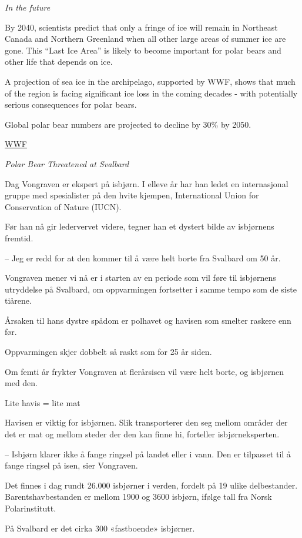 \documentclass[
]{book}
\begin{document}
\emph{In the future}

By 2040, scientists predict that only a fringe of ice will remain in Northeast Canada and Northern Greenland when all other large areas of summer ice are gone. This ``Last Ice Area'' is likely to become important for polar bears and other life that depends on ice.

A projection of sea ice in the archipelago, supported by WWF, shows that much of the region is facing significant ice loss in the coming decades - with potentially serious consequences for polar bears.

Global polar bear numbers are projected to decline by 30\% by 2050.

\href{https://arcticwwf.org/species/polar-bear/population/}{WWF}

\emph{Polar Bear Threatened at Svalbard}

Dag Vongraven er ekspert på isbjørn. I elleve år har han ledet en internasjonal gruppe med spesialister på den hvite kjempen, International Union for Conservation of Nature (IUCN).

Før han nå gir ledervervet videre, tegner han et dystert bilde av isbjørnens fremtid.

-- Jeg er redd for at den kommer til å være helt borte fra Svalbard om 50 år.

Vongraven mener vi nå er i starten av en periode som vil føre til isbjørnens utryddelse på Svalbard, om oppvarmingen fortsetter i samme tempo som de siste tiårene.

Årsaken til hans dystre spådom er polhavet og havisen som smelter raskere enn før.

Oppvarmingen skjer dobbelt så raskt som for 25 år siden.

Om femti år frykter Vongraven at flerårsisen vil være helt borte, og isbjørnen med den.

Lite havis = lite mat

Havisen er viktig for isbjørnen. Slik transporterer den seg mellom områder der det er mat og mellom steder der den kan finne hi, forteller isbjørneksperten.

-- Isbjørn klarer ikke å fange ringsel på landet eller i vann. Den er tilpasset til å fange ringsel på isen, sier Vongraven.

Det finnes i dag rundt 26.000 isbjørner i verden, fordelt på 19 ulike delbestander. Barentshavbestanden er mellom 1900 og 3600 isbjørn, ifølge tall fra Norsk Polarinstitutt.

På Svalbard er det cirka 300 «fastboende» isbjørner.
\end{document}
